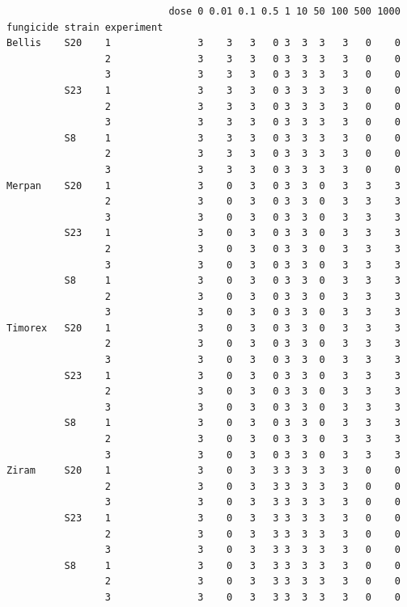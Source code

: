 \documentclass[
  letterpaper,
  DIV=11,
  numbers=noendperiod]{scrreport}
\begin{document}
\begin{verbatim}
                            dose 0 0.01 0.1 0.5 1 10 50 100 500 1000
fungicide strain experiment                                         
Bellis    S20    1               3    3   3   0 3  3  3   3   0    0
                 2               3    3   3   0 3  3  3   3   0    0
                 3               3    3   3   0 3  3  3   3   0    0
          S23    1               3    3   3   0 3  3  3   3   0    0
                 2               3    3   3   0 3  3  3   3   0    0
                 3               3    3   3   0 3  3  3   3   0    0
          S8     1               3    3   3   0 3  3  3   3   0    0
                 2               3    3   3   0 3  3  3   3   0    0
                 3               3    3   3   0 3  3  3   3   0    0
Merpan    S20    1               3    0   3   0 3  3  0   3   3    3
                 2               3    0   3   0 3  3  0   3   3    3
                 3               3    0   3   0 3  3  0   3   3    3
          S23    1               3    0   3   0 3  3  0   3   3    3
                 2               3    0   3   0 3  3  0   3   3    3
                 3               3    0   3   0 3  3  0   3   3    3
          S8     1               3    0   3   0 3  3  0   3   3    3
                 2               3    0   3   0 3  3  0   3   3    3
                 3               3    0   3   0 3  3  0   3   3    3
Timorex   S20    1               3    0   3   0 3  3  0   3   3    3
                 2               3    0   3   0 3  3  0   3   3    3
                 3               3    0   3   0 3  3  0   3   3    3
          S23    1               3    0   3   0 3  3  0   3   3    3
                 2               3    0   3   0 3  3  0   3   3    3
                 3               3    0   3   0 3  3  0   3   3    3
          S8     1               3    0   3   0 3  3  0   3   3    3
                 2               3    0   3   0 3  3  0   3   3    3
                 3               3    0   3   0 3  3  0   3   3    3
Ziram     S20    1               3    0   3   3 3  3  3   3   0    0
                 2               3    0   3   3 3  3  3   3   0    0
                 3               3    0   3   3 3  3  3   3   0    0
          S23    1               3    0   3   3 3  3  3   3   0    0
                 2               3    0   3   3 3  3  3   3   0    0
                 3               3    0   3   3 3  3  3   3   0    0
          S8     1               3    0   3   3 3  3  3   3   0    0
                 2               3    0   3   3 3  3  3   3   0    0
                 3               3    0   3   3 3  3  3   3   0    0
\end{verbatim}
\end{document}
